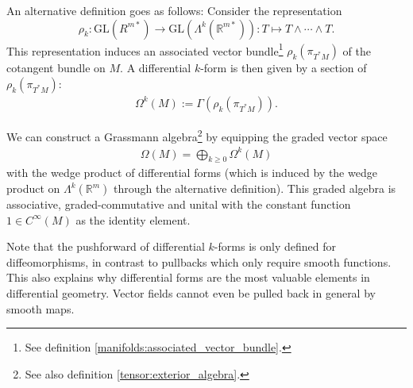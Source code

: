     \begin{adefinition}
        An alternative definition goes as follows: Consider the representation \[\rho_k:\text{GL}(R^{m*})\rightarrow\text{GL}(\Lambda^k(\mathbb{R}^{m*})): T\mapsto T\wedge\cdots\wedge T.\] This representation induces an associated vector bundle\footnote{See definition \ref{manifolds:associated_vector_bundle}.} $\rho_k(\pi_{T^*M})$ of the cotangent bundle on $M$. A differential $k$-form is then given by a section of $\rho_k(\pi_{T^*M})$:
        \begin{gather}
            \Omega^k(M) := \Gamma(\rho_k(\pi_{T^*M})).
        \end{gather}
    \end{adefinition}

    \begin{construct}
        We can construct a Grassmann algebra\footnote{See also definition \ref{tensor:exterior_algebra}.} by equipping the graded vector space
        \begin{gather}
            \Omega(M) = \bigoplus_{k\geq0}\Omega^k(M)
        \end{gather}
        with the wedge product of differential forms (which is induced by the wedge product on $\Lambda^k(\mathbb{R}^m)$ through the alternative definition). This graded algebra is associative, graded-commutative and unital with the constant function $1\in C^{\infty}(M)$ as the identity element.
    \end{construct}

    \begin{remark*}
        Note that the pushforward of differential $k$-forms is only defined for diffeomorphisms, in contrast to pullbacks which only require smooth functions. This also explains why differential forms are the most valuable elements in differential geometry. Vector fields cannot even be pulled back in general by smooth maps.
    \end{remark*}

